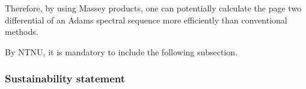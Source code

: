 Therefore, by using Massey products, one can potentially calculate the page two differential of an Adams spectral sequence more efficiently than conventional methods.

By NTNU, it is mandatory to include the following subsection.
\subsubsection{Sustainability statement}

